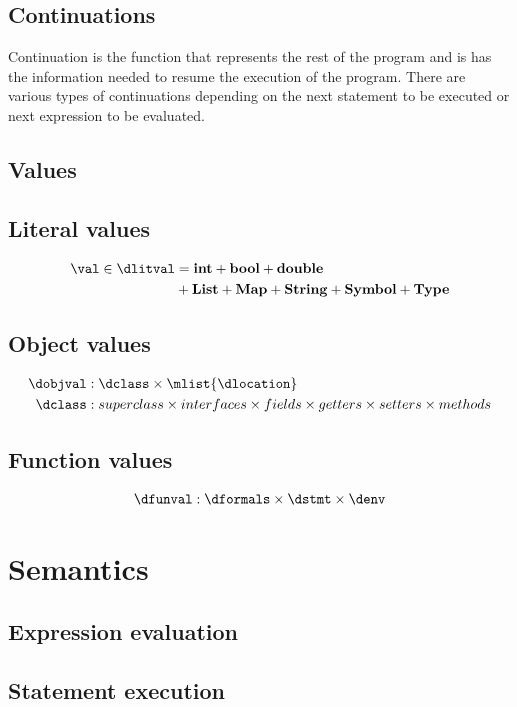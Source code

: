 \documentclass{article}
\begin{document}
\subsection{Continuations}

Continuation is the function that represents the rest of the program and is has the information needed to resume the execution of the program. 
There are various types of continuations depending on the next statement to be executed or next expression to be evaluated.

\subsection{Values}
\subsection{Literal values}
\begin{align*}
\val \in \dlitval &= \mathbf{int} + \mathbf{bool} + \mathbf{double} \\ &+ \mathbf{List} + \mathbf{Map} + \mathbf{String} + \mathbf{Symbol} + \mathbf{Type} 
\end{align*} 
\subsection{Object values}
\begin{align*}
 \dobjval &: \dclass \times \mlist{\dlocation}\\
 \dclass &: superclass \times interfaces \times fields \times getters \times setters \times methods
\end{align*}

\subsection{Function values}
\begin{align*}
\dfunval : \dformals \times \dstmt \times \denv 
\end{align*}

\section{Semantics}
\subsection{Expression evaluation}
\subsection{Statement execution}
\end{document}
